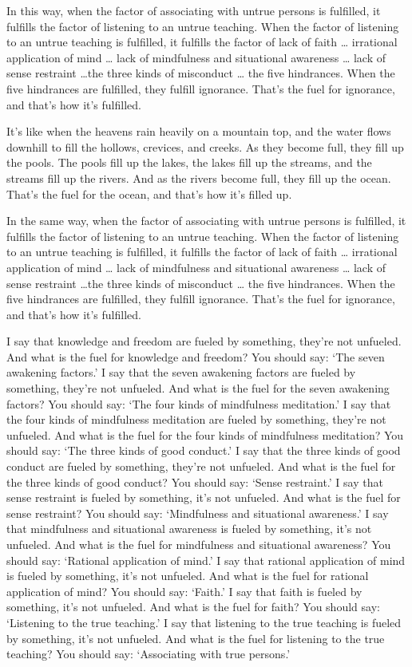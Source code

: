 \documentclass[12pt,openany]{book}%
\begin{document}
In this way, when the factor of associating with untrue persons is fulfilled, it fulfills the factor of listening to an untrue teaching. When the factor of listening to an untrue teaching is fulfilled, it fulfills the factor of lack of faith … irrational application of mind … lack of mindfulness and situational awareness … lack of sense restraint …the three kinds of misconduct … the five hindrances. When the five hindrances are fulfilled, they fulfill ignorance. That’s the fuel for ignorance, and that’s how it’s fulfilled. 

It’s like when the heavens rain heavily on a mountain top, and the water flows downhill to fill the hollows, crevices, and creeks. As they become full, they fill up the pools. The pools fill up the lakes, the lakes fill up the streams, and the streams fill up the rivers. And as the rivers become full, they fill up the ocean. That’s the fuel for the ocean, and that’s how it’s filled up. 

In the same way, when the factor of associating with untrue persons is fulfilled, it fulfills the factor of listening to an untrue teaching. When the factor of listening to an untrue teaching is fulfilled, it fulfills the factor of lack of faith … irrational application of mind … lack of mindfulness and situational awareness … lack of sense restraint …the three kinds of misconduct … the five hindrances. When the five hindrances are fulfilled, they fulfill ignorance. That’s the fuel for ignorance, and that’s how it’s fulfilled. 

I say that knowledge and freedom are fueled by something, they’re not unfueled. And what is the fuel for knowledge and freedom? You should say: ‘The seven awakening factors.’ I say that the seven awakening factors are fueled by something, they’re not unfueled. And what is the fuel for the seven awakening factors? You should say: ‘The four kinds of mindfulness meditation.’ I say that the four kinds of mindfulness meditation are fueled by something, they’re not unfueled. And what is the fuel for the four kinds of mindfulness meditation? You should say: ‘The three kinds of good conduct.’ I say that the three kinds of good conduct are fueled by something, they’re not unfueled. And what is the fuel for the three kinds of good conduct? You should say: ‘Sense restraint.’ I say that sense restraint is fueled by something, it’s not unfueled. And what is the fuel for sense restraint? You should say: ‘Mindfulness and situational awareness.’ I say that mindfulness and situational awareness is fueled by something, it’s not unfueled. And what is the fuel for mindfulness and situational awareness? You should say: ‘Rational application of mind.’ I say that rational application of mind is fueled by something, it’s not unfueled. And what is the fuel for rational application of mind? You should say: ‘Faith.’ I say that faith is fueled by something, it’s not unfueled. And what is the fuel for faith? You should say: ‘Listening to the true teaching.’ I say that listening to the true teaching is fueled by something, it’s not unfueled. And what is the fuel for listening to the true teaching? You should say: ‘Associating with true persons.’ 
\end{document}
